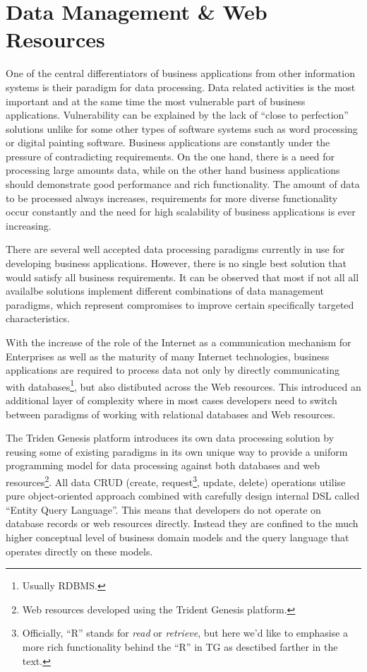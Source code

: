 \section{Data Management \& Web Resources}\label{sec:04}

  One of the central differentiators of business applications from other information systems is their paradigm for data processing.
  Data related activities is the most important and at the same time the most vulnerable part of business applications.
  Vulnerability can be explained by the lack of ``close to perfection'' solutions unlike for some other types of software systems such as word processing or digital painting software.
  Business applications are constantly under the pressure of contradicting requirements.
  On the one hand, there is a need for processing large amounts data, while on the other hand business applications should demonstrate good performance and rich functionality.
  The amount of data to be processed always increases, requirements for more diverse functionality occur constantly and the need for high scalability of business applications is ever increasing.
  
  There are several well accepted data processing paradigms currently in use for developing business applications.
  However, there is no single best solution that would satisfy all business requirements.
  It can be observed that most if not all all availalbe solutions implement different combinations of data management paradigms, which represent compromises to improve certain specifically targeted characteristics.

  With the increase of the role of the Internet as a communication mechanism for Enterprises as well as the maturity of many Internet technologies, business applications are required to process data not only by directly communicating with databases\footnote{Usually RDBMS.}, but also distibuted across the Web resources.
  This introduced an additional layer of complexity where in most cases developers need to switch between paradigms of working with relational databases and Web resources.

  The Triden Genesis platform introduces its own data processing solution by reusing some of existing paradigms in its own unique way to provide a uniform programming model for data processing against both databases and web resources\footnote{Web resources developed using the Trident Genesis platform.}.
  All data CRUD (create, request\footnote{Officially, ``R'' stands for \emph{read} or \emph{retrieve}, but here we'd like to emphasise a more rich functionality behind the ``R'' in TG as desctibed farther in the text.}, update, delete) operations utilise pure object-oriented approach combined with carefully design internal DSL called ``Entity Query Language''.
  This means that developers do not operate on database records or web resources directly.
  Instead they are confined to the much higher conceptual level of business domain models and the query language that operates directly on these models.
  
